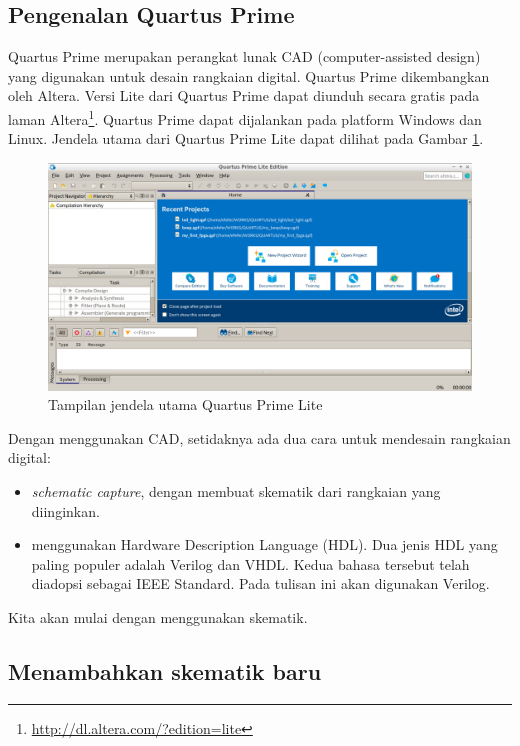 \subsection{Pengenalan Quartus Prime}

Quartus Prime merupakan perangkat lunak CAD (computer-assisted design)
yang digunakan untuk desain rangkaian digital. Quartus Prime dikembangkan
oleh Altera. Versi Lite dari Quartus Prime dapat diunduh secara gratis
pada laman Altera\footnote{\url{http://dl.altera.com/?edition=lite}}.
Quartus Prime dapat dijalankan pada
platform Windows dan Linux.
Jendela utama dari Quartus Prime Lite dapat dilihat pada Gambar
\ref{fig:main_window}.

\begin{figure}
\centering
\includegraphics[width=\textwidth]{images/FirstOpen.png}
\par
\caption{Tampilan jendela utama Quartus Prime Lite}\label{fig:main_window}
\end{figure}

Dengan menggunakan CAD, setidaknya ada dua cara untuk
mendesain rangkaian digital:
\begin{itemize}
\item \textit{schematic capture}, dengan membuat skematik dari rangkaian yang
diinginkan.
\item menggunakan Hardware Description Language (HDL).
Dua jenis HDL yang paling populer adalah Verilog dan VHDL.
Kedua bahasa tersebut telah diadopsi sebagai IEEE Standard.
Pada tulisan ini akan digunakan Verilog.
\end{itemize}

Kita akan mulai dengan menggunakan skematik.

\subsection{Menambahkan skematik baru}\label{subsec:skematik}

